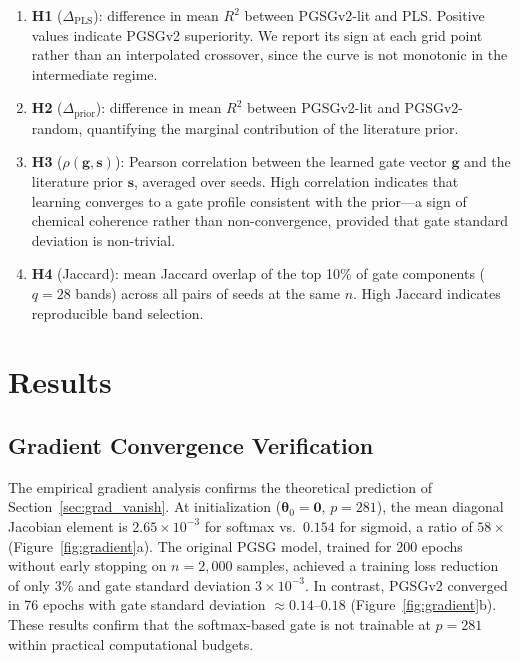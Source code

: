 \documentclass[preprint,12pt,hidelinks]{elsarticle}
\begin{document}
\begin{enumerate}
  \item \textbf{H1} ($\Delta_\mathrm{PLS}$): difference in mean $R^2$
        between PGSGv2-lit and PLS. Positive values indicate PGSGv2
        superiority. We report its sign at each grid point rather than an
        interpolated crossover, since the curve is not monotonic in the
        intermediate regime.

  \item \textbf{H2} ($\Delta_\mathrm{prior}$): difference in mean $R^2$
        between PGSGv2-lit and PGSGv2-random, quantifying the marginal
        contribution of the literature prior.

  \item \textbf{H3} ($\rho(\mathbf{g}, \mathbf{s})$): Pearson correlation
        between the learned gate vector $\mathbf{g}$ and the literature
        prior $\mathbf{s}$, averaged over seeds. High correlation indicates
        that learning converges to a gate profile consistent with the
        prior---a sign of chemical coherence rather than non-convergence,
        provided that gate standard deviation is non-trivial.

  \item \textbf{H4} (Jaccard): mean Jaccard overlap of the top 10\% of
        gate components ($q = 28$ bands) across all pairs of seeds at the
        same $n$. High Jaccard indicates reproducible band selection.
\end{enumerate}

\section{Results}
\label{sec:results}

\subsection{Gradient Convergence Verification}

The empirical gradient analysis confirms the theoretical prediction of
Section~\ref{sec:grad_vanish}. At initialization ($\boldsymbol{\theta}_0
= \mathbf{0}$, $p = 281$), the mean diagonal Jacobian element is
$2.65 \times 10^{-3}$ for softmax vs.\ $0.154$ for sigmoid, a ratio of
$58\times$ (Figure~\ref{fig:gradient}a). The original PGSG model, trained
for 200 epochs without early stopping on $n = 2{,}000$ samples, achieved a
training loss reduction of only 3\% and gate standard deviation
$3 \times 10^{-3}$. In contrast, PGSGv2 converged in 76 epochs with
gate standard deviation $\approx 0.14$--$0.18$ (Figure~\ref{fig:gradient}b).
These results confirm that the softmax-based gate is not trainable at
$p = 281$ within practical computational budgets.
\end{document}
